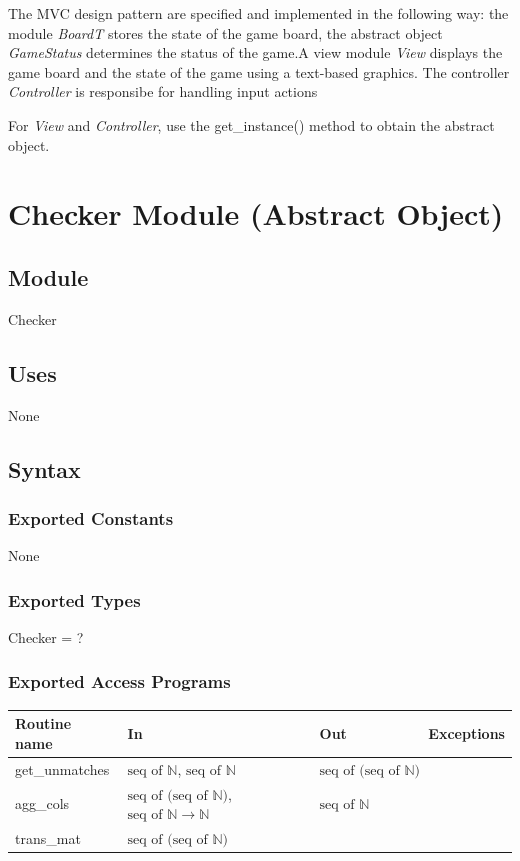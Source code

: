\documentclass[12pt]{article}
\begin{document}
\medskip

\noindent The MVC design pattern are specified and implemented in the following way: 
the module \textit{BoardT} stores the state of the game board, the abstract 
object \textit{GameStatus} determines the status of the game.A view module 
\textit{View} displays the game board and the state of the game using a 
text-based graphics. The controller \textit{Controller} is responsibe for 
handling input actions

\medskip

\noindent For \textit{View} and \textit{Controller}, use the get\_instance() method to obtain the abstract object.

\newpage

\section* {Checker Module (Abstract Object)}

\subsection*{Module}

Checker

\subsection* {Uses}

None

\subsection* {Syntax}

\subsubsection* {Exported Constants}

None

\subsubsection* {Exported Types}

Checker = ?

\subsubsection* {Exported Access Programs}

\begin{tabular}{| l | l | l | p{5cm} |}
\hline
\textbf{Routine name} & \textbf{In} & \textbf{Out} & \textbf{Exceptions}\\
\hline
get\_unmatches & $\text{seq of } \mathbb{N}$, $\text{seq of } \mathbb{N}$ & $\text{seq of (seq of } \mathbb{N} \text{)}$ & \\
\hline
agg\_cols & $\text{seq of (seq of } \mathbb{N} \text{)}$, $\text{seq of } \mathbb{N} \rightarrow \mathbb{N}$ & $\text{seq of } \mathbb{N}$ & \\
\hline
trans\_mat & $\text{seq of (seq of } \mathbb{N} \text{)}$ & & \\
\hline

\end{tabular}
\end{document}
